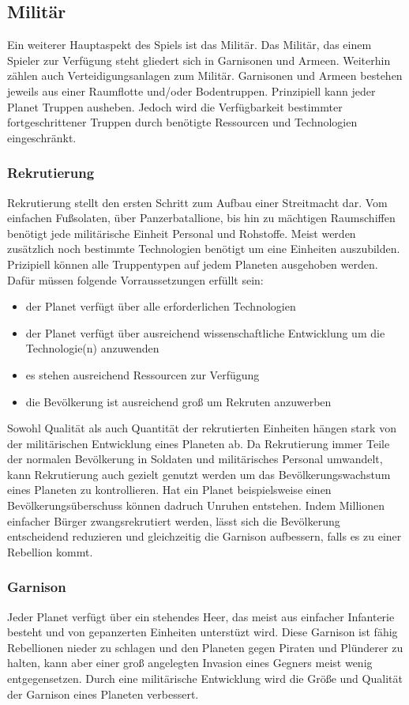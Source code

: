\documentclass[11pt, a4paper]{article}
\begin{document}
\subsection{Militär}
Ein weiterer Hauptaspekt des Spiels ist das Militär. Das Militär, das einem Spieler zur Verfügung steht 
gliedert sich in Garnisonen und Armeen. Weiterhin zählen auch Verteidigungsanlagen zum Militär.
Garnisonen und Armeen bestehen jeweils aus einer Raumflotte und/oder Bodentruppen. Prinzipiell kann jeder
Planet Truppen ausheben. Jedoch wird die Verfügbarkeit bestimmter fortgeschrittener Truppen durch benötigte 
Ressourcen und Technologien eingeschränkt.
%
\subsubsection{Rekrutierung}
Rekrutierung stellt den ersten Schritt zum Aufbau einer Streitmacht dar. Vom einfachen Fußsolaten, über 
Panzerbatallione, bis hin zu mächtigen Raumschiffen benötigt jede militärische Einheit Personal und Rohstoffe.
Meist werden zusätzlich noch bestimmte Technologien benötigt um eine Einheiten auszubilden. Prizipiell können 
alle Truppentypen auf jedem Planeten ausgehoben werden. Dafür müssen folgende Vorraussetzungen erfüllt sein:
\begin{itemize}
    \item der Planet verfügt über alle erforderlichen Technologien
    \item der Planet verfügt über ausreichend wissenschaftliche Entwicklung um die Technologie(n) anzuwenden
    \item es stehen ausreichend Ressourcen zur Verfügung
    \item die Bevölkerung ist ausreichend groß um Rekruten anzuwerben
\end{itemize}
%
Sowohl Qualität als auch Quantität der rekrutierten Einheiten hängen stark von der militärischen Entwicklung
eines Planeten ab. Da Rekrutierung immer Teile der normalen Bevölkerung in Soldaten und militärisches Personal
umwandelt, kann Rekrutierung auch gezielt genutzt werden um das Bevölkerungswachstum eines Planeten zu
kontrollieren. Hat ein Planet beispielsweise einen Bevölkerungsüberschuss können dadruch Unruhen entstehen.
Indem Millionen einfacher Bürger zwangsrekrutiert werden, lässt sich die Bevölkerung entscheidend reduzieren
und gleichzeitig die Garnison aufbessern, falls es zu einer Rebellion kommt.
%
\subsubsection{Garnison}
Jeder Planet verfügt über ein stehendes Heer, das meist aus einfacher Infanterie besteht und von gepanzerten 
Einheiten unterstüzt wird. Diese Garnison ist fähig Rebellionen nieder zu schlagen und den Planeten gegen 
Piraten und Plünderer zu halten, kann aber einer groß angelegten Invasion eines Gegners meist wenig 
entgegensetzen. Durch eine militärische Entwicklung wird die Größe und Qualität der Garnison eines Planeten
verbessert.
%
\end{document}
